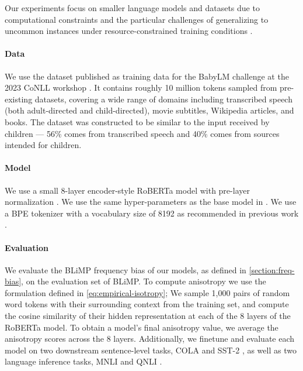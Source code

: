 Our experiments focus on smaller language models and datasets due to computational constraints and the particular challenges of generalizing to uncommon instances under resource-constrained training conditions \citep{warstadt2023babylm1,diehlmartinez2023climb}. 

\paragraph{Data} \label{paragraph:data} We use the dataset published as training data for the BabyLM challenge at the 2023 CoNLL workshop \citep{warstadt2023babylm1}. It contains roughly 10 million tokens sampled from pre-existing datasets, covering a wide range of domains including transcribed speech (both adult-directed and child-directed), movie subtitles, Wikipedia articles, and books. The dataset was constructed to be similar to the input received by children --- 56\% comes from transcribed speech and 40\% comes from sources intended for children.

\paragraph{Model} We use a small 8-layer encoder-style RoBERTa model with pre-layer normalization \cite{huebner2021babyberta}. We use the same hyper-parameters as the base model in \cite{diehlmartinez2023climb}. We use a BPE tokenizer \citep{sennrich2016bpe} with a vocabulary size of 8192 as recommended in previous work \cite{diehlmartinez2023climb}. 

\paragraph{Evaluation} We evaluate the BLiMP frequency bias of our models, as defined in \cref{section:freq-bias}, on the evaluation set of BLiMP. To compute anisotropy we use the formulation defined in \cref{eq:empirical-isotropy}; We sample 1,000 pairs of random word tokens with their surrounding context from the training set, and compute the cosine similarity of their hidden representation at each of the 8 layers of the RoBERTa model. To obtain a model's final anisotropy value, we average the anisotropy scores across the 8 layers. Additionally, we finetune and evaluate each model on two downstream sentence-level tasks, COLA \citep{warstadt2019cola} and SST-2 \citep{socher2013sst}, as well as two language inference tasks, MNLI \citep{williams2018mnli} and QNLI \citep{rajpurkar2016squad, wang2018glue}.


